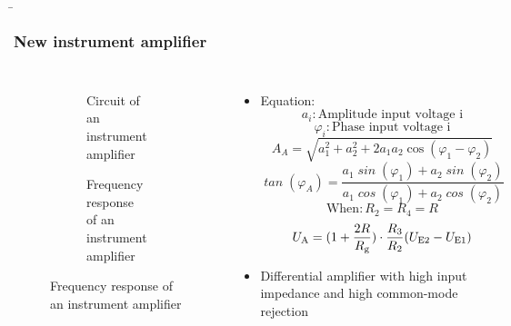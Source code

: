 \begin{frame}
    \b{
    \frametitle{New instrument amplifier}
    \begin{columns}
        \centering
        \begin{figure}
    \centering

    \begin{subfigure}{\linewidth}
        \centering
        \resizebox{0.6\linewidth}{!}{}
        \caption{Circuit of an instrument amplifier}
    \end{subfigure}

    \vspace{0.5cm} 

    \begin{subfigure}{\linewidth}
        \centering
        \resizebox{0.6\linewidth}{!}{}
        \caption{Frequency response of an instrument amplifier}
    \end{subfigure}

\end{figure}

        \raggedleft
        \begin{itemize}
            \item Equation:
         \[
\mathit{a_i} : \text{Amplitude input voltage i}
\]
\[
\mathit{\varphi_i} : \text{Phase input voltage i}
\]
\[
\mathit{A}_{A} = \sqrt{a_1^2 + a_2^2 + 2a_1a_2 \cos(\varphi_1 - \varphi_2)}
\]
\[
\mathit{\tan}(\varphi_A) = \frac{a_1 \mathit{\sin}(\varphi_1) + a_2 \mathit{\sin}(\varphi_2)}{a_1 \mathit{\cos}(\varphi_1) + a_2 \mathit{\cos}(\varphi_2)}
\]
\[
    \text{When} : R_2 = R_4 = R
\]
\[
    U_{\textnormal{A}} = (1+ \frac{2R} {R_{\textnormal{g}}}) \cdot \frac{R_3} {R_2} (U_{\textnormal{E2}}-U_{\textnormal{E1}})
\]
        \item Differential amplifier with high input impedance and high common-mode rejection    
    \end{itemize}
    \end{columns}
    }
\end{frame}



